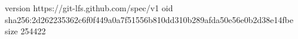 version https://git-lfs.github.com/spec/v1
oid sha256:2d262235362c6f0f449a0a7f51556b810dd310b289afda50e56e0b2d38e14fbe
size 254422
